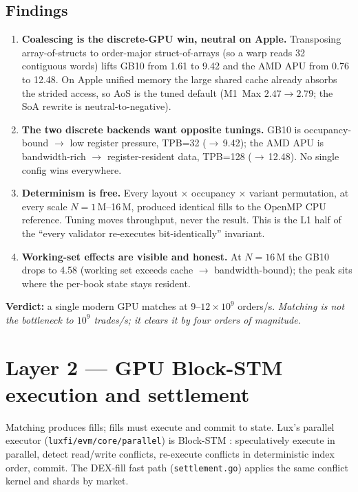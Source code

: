 \documentclass[11pt,a4paper]{article}
\begin{document}
\subsection{Findings}
\begin{enumerate}[leftmargin=2em,itemsep=1pt]
  \item \textbf{Coalescing is the discrete-GPU win, neutral on Apple.}
        Transposing array-of-structs to order-major struct-of-arrays
        (so a warp reads 32 contiguous words) lifts GB10 from
        \num{1.61} to \SI{9.42}{} and the AMD APU from
        \num{0.76} to \SI{12.48}{}. On Apple unified
        memory the large shared cache already absorbs the strided
        access, so AoS is the tuned default (M1~Max
        $2.47\!\to\!2.79$; the SoA rewrite is neutral-to-negative).
  \item \textbf{The two discrete backends want opposite tunings.} GB10
        is occupancy-bound $\to$ low register pressure, TPB=32
        ($\to$\,\SI{9.42}{}); the AMD APU is bandwidth-rich
        $\to$ register-resident data, TPB=128
        ($\to$\,\SI{12.48}{}). No single config wins everywhere.
  \item \textbf{Determinism is free.} Every layout $\times$ occupancy
        $\times$ variant permutation, at every scale $N=1$\,M--16\,M,
        produced identical fills to the OpenMP CPU reference. Tuning
        moves throughput, never the result. This is the L1 half of the
        ``every validator re-executes bit-identically'' invariant.
  \item \textbf{Working-set effects are visible and honest.} At
        $N=16$\,M the GB10 drops to \SI{4.58}{} (working set
        exceeds cache $\to$ bandwidth-bound); the peak sits where the
        per-book state stays resident.
\end{enumerate}

\noindent\textbf{Verdict:} a single modern GPU matches at
$9$--$12\times10^{9}$ orders/s. \emph{Matching is not the bottleneck to
$10^9$ trades/s; it clears it by four orders of magnitude.}

\section{Layer 2 --- GPU Block-STM execution and settlement}\label{sec:l2}

Matching produces fills; fills must execute and commit to state. Lux's
parallel executor (\texttt{luxfi/evm/core/parallel}) is Block-STM
\cite{blockstm2022,lp210}: speculatively execute in parallel, detect
read/write conflicts, re-execute conflicts in deterministic index order,
commit. The DEX-fill fast path (\texttt{settlement.go}) applies the same
conflict kernel and shards by market.
\end{document}
